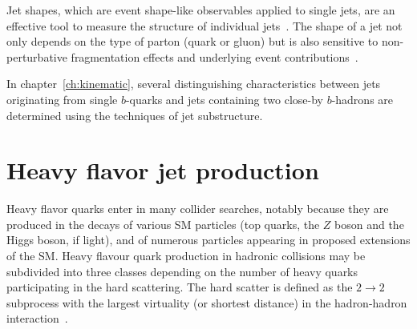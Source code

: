 Jet shapes, which are event shape-like observables applied to single jets, are an effective tool to measure the structure of individual jets~\cite{springerlink:10.1007/JHEP11(2010)101}.%
 The shape of a jet not only depends on the type of parton (quark or gluon) but is also sensitive to non-perturbative fragmentation effects and underlying event contributions~\cite{ATLASJetShapes}.




In chapter~\ref{ch:kinematic}, several distinguishing characteristics between jets originating from single $b$-quarks and jets containing two close-by  $b$-hadrons are determined using the techniques of jet substructure. 







\section{Heavy flavor jet production}%

Heavy flavor quarks enter in many collider searches, notably because they are produced in the decays of various SM particles (top quarks, the $Z$ boson and the Higgs boson, if light), and of numerous particles appearing in proposed extensions of the SM.
 Heavy flavour quark production in hadronic collisions may be subdivided into three classes depending on the number of heavy quarks participating in the hard scattering. The hard scatter is defined as the $2 \rightarrow 2$ subprocess with the largest virtuality (or shortest distance) in the hadron-hadron interaction~\cite{Norrbin:2000zc}.


